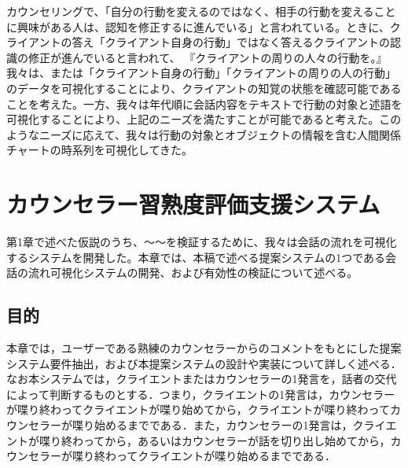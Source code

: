 \documentclass[shuuron]{kuee}
\begin{document}
 カウンセリングで、「自分の行動を変えるのではなく、相手の行動を変えることに興味がある人は、認知を修正するに進んでいる」と言われている。ときに、クライアントの答え「クライアント自身の行動」ではなく答えるクライアントの認識の修正が進んでいると言われて、 『クライアントの周りの人々の行動を。』
 我々は、または「クライアント自身の行動」「クライアントの周りの人の行動」のデータを可視化することにより、クライアントの知覚の状態を確認可能であることを考えた。一方、我々は年代順に会話内容をテキストで行動の対象と述語を可視化することにより、上記のニーズを満たすことが可能であると考えた。このようなニーズに応えて、我々は行動の対象とオブジェクトの情報を含む人間関係チャートの時系列を可視化してきた。



\chapter{カウンセラー習熟度評価支援システム}





第1章で述べた仮説のうち、〜〜を検証するために、我々は会話の流れを可視化するシステムを開発した。本章では、本稿で述べる提案システムの1つである会話の流れ可視化システムの開発、および有効性の検証について述べる。
\section{目的}

本章では，ユーザーである熟練のカウンセラーからのコメントをもとにした提案システム要件抽出，および本提案システムの設計や実装について詳しく述べる．なお本システムでは，クライエントまたはカウンセラーの1発言を，話者の交代によって判断するものとする．つまり，クライエントの1発言は，カウンセラーが喋り終わってクライエントが喋り始めてから，クライエントが喋り終わってカウンセラーが喋り始めるまでである．また，カウンセラーの1発言は，クライエントが喋り終わってから，あるいはカウンセラーが話を切り出し始めてから，カウンセラーが喋り終わってクライエントが喋り始めるまでである．
\end{document}
